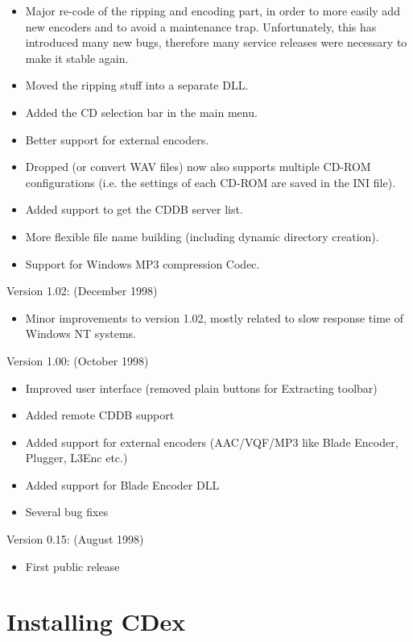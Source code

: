 \begin{itemize}
\itemsep=0pt
\item Major re-code of the ripping and encoding part, in order to more easily
add new encoders and to avoid a maintenance trap. Unfortunately, this has
introduced many new bugs, therefore many service releases were necessary to
make it stable again.
\item Moved the ripping stuff into a separate DLL.
\item Added the CD selection bar in the main menu.
\item Better support for external encoders.
\item Dropped (or convert WAV files) now also supports multiple CD-ROM
configurations
(i.e. the settings of each CD-ROM are saved in the INI file).
\item Added support to get the CDDB server list.
\item More flexible file name building (including dynamic directory creation).
\item Support for Windows MP3 compression Codec.
\end{itemize}

Version 1.02: (December 1998)

\begin{itemize}
\itemsep=0pt
\item Minor improvements to version 1.02, mostly related to slow response time
of Windows NT systems.
\end{itemize}

Version 1.00: (October 1998)

\begin{itemize}
\itemsep=0pt
\item Improved user interface (removed plain buttons for Extracting toolbar)
\item Added remote CDDB support
\item Added support for external encoders (AAC/VQF/MP3 like Blade Encoder,
Plugger, L3Enc etc.)
\item Added support for Blade Encoder DLL
\item Several bug fixes
\end{itemize}

Version 0.15: (August 1998)

\begin{itemize}
\itemsep=0pt
\item First public release
\end{itemize}


\chapter{Installing CDex}
\setfooter{\thepage}{}{}{}{}{\thepage}

